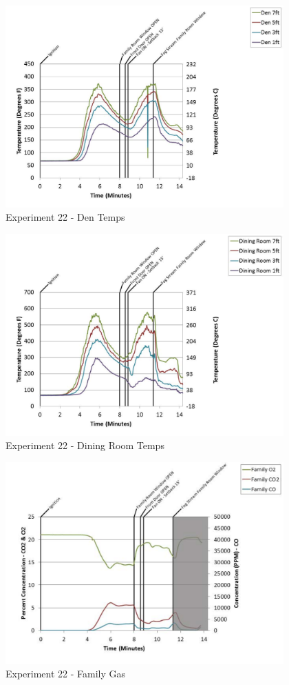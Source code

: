 \documentclass{article}
\begin{document}
\begin{appendices}
	\begin{figure}[h!]
		\centering
		\includegraphics[height=3.05in]{0_Images/Results_Charts/Exp_22_Charts/DenTemps.pdf}
		\caption{Experiment 22 - Den Temps}
	\end{figure}
 
	\clearpage

	\begin{figure}[h!]
		\centering
		\includegraphics[height=3.05in]{0_Images/Results_Charts/Exp_22_Charts/DiningRoomTemps.pdf}
		\caption{Experiment 22 - Dining Room Temps}
	\end{figure}
 

	\begin{figure}[h!]
		\centering
		\includegraphics[height=3.05in]{0_Images/Results_Charts/Exp_22_Charts/FamilyGas.pdf}
		\caption{Experiment 22 - Family Gas}
	\end{figure}
 

\end{appendices}
\end{document}
